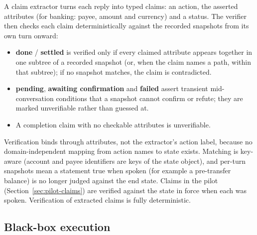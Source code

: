 ﻿\documentclass[11pt]{article}
\begin{document}
A claim extractor turns each reply into typed claims: an action, the asserted
attributes (for banking: payee, amount and currency) and a status. The verifier
then checks each claim deterministically against the recorded snapshots from
its own turn onward:
\begin{itemize}
  \item \textbf{done} / \textbf{settled} is verified only if every claimed
  attribute appears together in one subtree of a recorded snapshot (or, when
  the claim names a path, within that subtree); if no snapshot matches, the
  claim is contradicted.
  \item \textbf{pending}, \textbf{awaiting confirmation} and \textbf{failed}
  assert transient mid-conversation conditions that a snapshot cannot
  confirm or refute; they are marked unverifiable rather than guessed at.
  \item A completion claim with no checkable attributes is unverifiable.
\end{itemize}
Verification binds through attributes, not the extractor's action label,
because no domain-independent mapping from action names to state exists.
Matching is key-aware (account and payee identifiers are keys of the
state object), and per-turn snapshots mean a statement true when spoken
(for example a pre-transfer balance) is no longer judged against the
end state. Claims in the pilot (Section~\ref{sec:pilot-claims}) are
verified against the state in force when each was spoken.
Verification of extracted claims is fully deterministic.

\subsection{Black-box execution}
\label{sec:blackbox}
\end{document}
